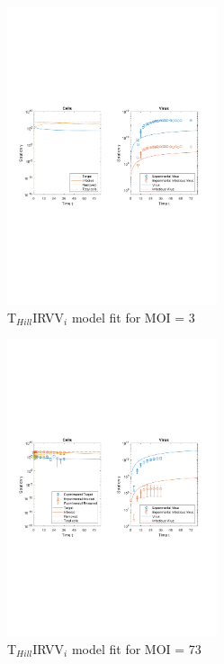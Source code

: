 \begin{figure}[H]
\begin{center}
\includegraphics[width=0.55\textwidth, trim={1cm 9.5cm 1cm 9.5cm}, clip]{D_chapters/6_appendix/4_THillIRVVi/ModelTHillIRVViDSNSaenz2010FittedMOI3B0.00075706D0.48368P3170.4056C7.3991e-06TIC3370474.3371TH3.9395iFrac0.02289log.pdf}
\caption[T$_{Hill}$IRVV$_i$ model fit for MOI = 3]%
{T$_{Hill}$IRVV$_i$ model fit for MOI = 3}
\label{figure:THillIRVViMOI3}
\end{center}
\end{figure}

\begin{figure}[H]
\begin{center}
\includegraphics[width=0.55\textwidth, trim={1cm 9.5cm 1cm 9.5cm}, clip]{D_chapters/6_appendix/4_THillIRVVi/ModelTHillIRVViDSNSaenz2010FittedMOI73B0.00075706D0.48368P3170.4056C7.3991e-06TIC3370474.3371TH3.9395iFrac0.02289log.pdf}
\caption[T$_{Hill}$IRVV$_i$ model fit for MOI = 73]%
{T$_{Hill}$IRVV$_i$ model fit for MOI = 73}
\label{figure:THillIRVViMOI73}
\end{center}
\end{figure}

